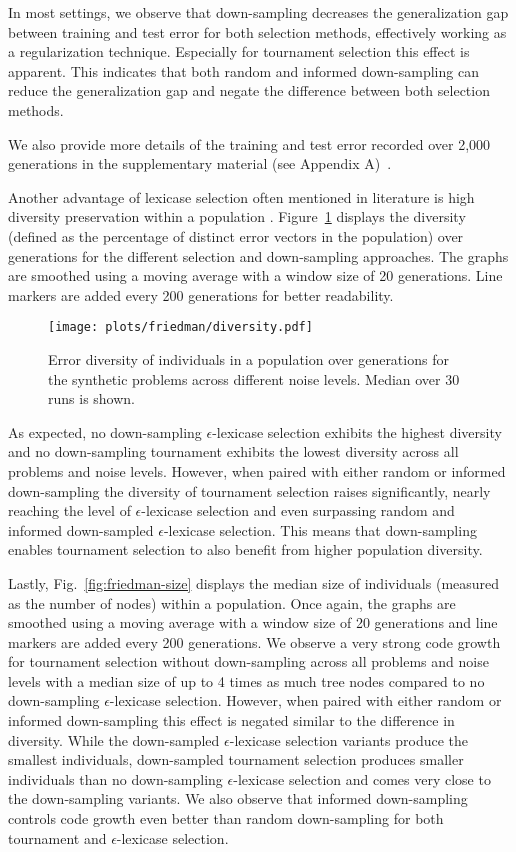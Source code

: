 \documentclass[runningheads]{llncs}
\begin{document}
In most settings, we observe that down-sampling decreases the generalization gap between training and test error for both selection methods, effectively working as a regularization technique. Especially for tournament selection this effect is apparent. This indicates that both random and informed down-sampling can reduce the generalization gap and negate the difference between both selection methods.

We also provide more details of the training and test error recorded over 2,000 generations in the supplementary material (see Appendix A)~\cite{zenodo}.


Another advantage of lexicase selection often mentioned in literature is high diversity preservation within a population \cite{Helmuth.2016}. Figure~\ref{fig:friedman-diversity} displays the diversity (defined as the percentage of distinct error vectors in the population) over generations for the different selection and down-sampling approaches. The graphs are smoothed using a moving average with a window size of 20 generations. Line markers are added every 200 generations for better readability.

\begin{figure}
    \centering
    \texttt{[image: plots/friedman/diversity.pdf]}
    \caption{Error diversity of individuals in a population over generations for the synthetic problems across different noise levels. Median over 30 runs is shown.}
    \label{fig:friedman-diversity}
\end{figure}

As expected, no down-sampling $\epsilon$-lexicase selection exhibits the highest diversity and no down-sampling tournament exhibits the lowest diversity across all problems and noise levels. However, when paired with either random or informed down-sampling the diversity of tournament selection raises significantly, nearly reaching the level of $\epsilon$-lexicase selection and even surpassing random and informed down-sampled $\epsilon$-lexicase selection. This means that down-sampling enables tournament selection to also benefit from higher population diversity. 


Lastly, Fig.~\ref{fig:friedman-size} displays the median size of individuals (measured as the number of nodes) within a population. Once again, the graphs are smoothed using a moving average with a window size of 20 generations and line markers are added every 200 generations.
We observe a very strong code growth for tournament selection without down-sampling across all problems and noise levels with a median size of up to 4 times as much tree nodes compared to no down-sampling $\epsilon$-lexicase selection. However, when paired with either random or informed down-sampling this effect is negated similar to the difference in diversity. While the down-sampled $\epsilon$-lexicase selection variants produce the smallest individuals, down-sampled tournament selection produces smaller individuals than no down-sampling $\epsilon$-lexicase selection and comes very close to the down-sampling variants. We also observe that informed down-sampling controls code growth even better than random down-sampling for both tournament and $\epsilon$-lexicase selection. 
\end{document}
